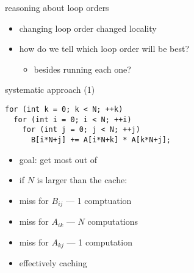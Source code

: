 \begin{frame}{reasoning about loop orders}
    \begin{itemize}
    \item changing loop order changed locality
        \vspace{.5cm}
    \item how do we tell which loop order will be best?
        \begin{itemize}
        \item besides running each one?
        \end{itemize}
    \end{itemize}
\end{frame}

\begin{frame}[fragile,label=cacheBlockMotivation]{systematic approach (1)}
\lstset{style=small,language=C}
\begin{lstlisting}
for (int k = 0; k < N; ++k)
  for (int i = 0; i < N; ++i)
    for (int j = 0; j < N; ++j)
      B[i*N+j] += A[i*N+k] * A[k*N+j];
\end{lstlisting}
\begin{itemize}
\item goal: get most out of 
\item if $N$ is larger than the cache:
\item miss for $B_{ij}$ --- 1 comptuation
\item miss for $A_{ik}$ --- $N$ computations
\item miss for $A_{kj}$ --- 1 computation
\item effectively caching 
\end{itemize}
\end{frame}

